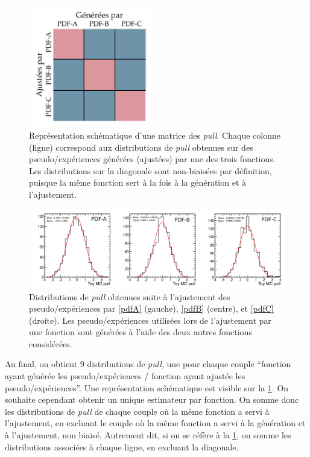 \begin{figure}[tbp]
  \centering
  \includegraphics[width=0.48\textwidth]{chapitre7/figs/pull_matrix.pdf}
  \caption{Représentation schématique d'une matrice des \emph{pull}. Chaque colonne (ligne) correspond aux distributions de \emph{pull} obtenues sur des pseudo\-/expériences générées (ajustées) par une des trois fonctions. Les distributions sur la diagonale sont non-biaisées par définition, puisque la même fonction sert à la fois à la génération et à l'ajustement.}
  \label{fig:pull_matrix}
\end{figure}

\begin{figure}[tbp]
  \centering
  \includegraphics[width=\textwidth]{chapitre7/figs/alterfit_750.pdf}
  \caption{Distributions de \emph{pull} obtenues suite à l'ajustement des pseudo\-/expériences par \ref{pdfA} (gauche), \ref{pdfB} (centre), et \ref{pdfC} (droite). Les pseudo\-/expériences utilisées lors de l'ajustement par une fonction sont générées à l'aide des deux autres fonctions considérées.}
  \label{fig:pulls}
\end{figure}

Au final, on obtient 9 distributions de \emph{pull}, une pour chaque couple \enquote{fonction ayant générée les pseudo\-/expériences / fonction ayant ajustée les pseudo\-/expériences}. Une représentation schématique est visible sur la \cref{fig:pull_matrix}. On souhaite cependant obtenir un unique estimateur par fonction. On somme donc les distributions de \emph{pull} de chaque couple où la même fonction a servi à l'ajustement, en excluant le couple où la même fonction a servi à la génération et à l'ajustement, non biaisé. Autrement dit, si on se réfère à la \cref{fig:pull_matrix}, on somme les distributions associées à chaque ligne, en excluant la diagonale.

